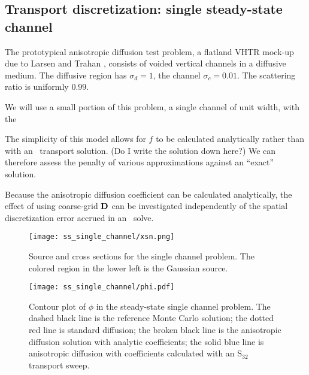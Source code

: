 \subsection{Transport discretization: single steady-state channel}

The prototypical anisotropic diffusion test problem, a flatland VHTR mock-up due
to Larsen and Trahan \cite{Lar2009c}, consists of voided vertical channels in a
diffusive medium. The diffusive region has $\sigma_d=1$, the channel
$\sigma_c=0.01$. The scattering ratio is uniformly $0.99$.

We will use a small portion of this problem, a single channel of unit width,
with the 

The simplicity of this model allows for $f$ to be calculated analytically
rather than with an \SN\ transport solution. (Do I write the solution down
here?) We can therefore assess the penalty of various approximations against an
``exact'' solution.

Because the anisotropic diffusion coefficient can be calculated analytically,
the effect of using coarse-grid $\mathbf{D}$ can be investigated independently of
the spatial discretization error accrued in an \SN\ solve.


\begin{figure}[htb]
  \centering
  \texttt{[image: ss\_single\_channel/xsn.png]}
  \caption[Source and cross sections for the single channel problem.]%
  {Source and cross sections for the single channel problem. The colored region
  in the lower left is the Gaussian source.}
  \label{fig:ssSingleXsn}
\end{figure}

\begin{figure}[htb]
  \centering
  \texttt{[image: ss\_single\_channel/phi.pdf]}
  \caption[Contour plot of $\phi$ in the steady-state single channel
  problem.]{Contour plot of $\phi$ in the steady-state single channel problem.
  The dashed black line is the reference Monte Carlo solution; the dotted red
  line is standard diffusion; the broken black line is the anisotropic
  diffusion solution with analytic coefficients; the solid blue line is
  anisotropic diffusion with coefficients calculated with an S$_{32}$ transport
  sweep.}
  \label{fig:ssSingleContour}
\end{figure}

